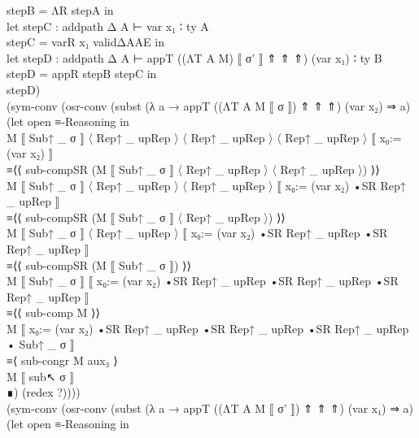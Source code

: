 {\begin{code}
{\>                                  stepB = ΛR stepA in\<\\
\>                              let stepC : addpath Δ A ⊢ var x₁ ∶ ty A\<\\
\>                                  stepC = varR x₁ validΔAAE in\<\\
\>                              let stepD : addpath Δ A ⊢ appT ((ΛT A M) ⟦ σ' ⟧ ⇑ ⇑ ⇑) (var x₁) ∶ ty B\<\\
\>                                  stepD = appR stepB stepC in\<\\
\>                              stepD)\<\\
\>                        (sym-conv (osr-conv (subst (λ a → appT ((ΛT A M ⟦ σ ⟧) ⇑ ⇑ ⇑) (var x₂) ⇒ a) (let open ≡-Reasoning in\<\\
\>                           M ⟦ Sub↑ \_ σ ⟧ 〈 Rep↑ \_ upRep 〉 〈 Rep↑ \_ upRep 〉 〈 Rep↑ \_ upRep 〉 ⟦ x₀:= (var x₂) ⟧\<\\
\>                         ≡⟨⟨ sub-compSR (M ⟦ Sub↑ \_ σ ⟧ 〈 Rep↑ \_ upRep 〉 〈 Rep↑ \_ upRep 〉) ⟩⟩\<\\
\>                           M ⟦ Sub↑ \_ σ ⟧ 〈 Rep↑ \_ upRep 〉 〈 Rep↑ \_ upRep 〉 ⟦ x₀:= (var x₂) •SR Rep↑ \_ upRep ⟧\<\\
\>                         ≡⟨⟨ sub-compSR (M ⟦ Sub↑ \_ σ ⟧ 〈 Rep↑ \_ upRep 〉) ⟩⟩\<\\
\>                           M ⟦ Sub↑ \_ σ ⟧ 〈 Rep↑ \_ upRep 〉 ⟦ x₀:= (var x₂) •SR Rep↑ \_ upRep •SR Rep↑ \_ upRep ⟧\<\\
\>                         ≡⟨⟨ sub-compSR (M ⟦ Sub↑ \_ σ ⟧) ⟩⟩\<\\
\>                           M ⟦ Sub↑ \_ σ ⟧ ⟦ x₀:= (var x₂) •SR Rep↑ \_ upRep •SR Rep↑ \_ upRep •SR Rep↑ \_ upRep ⟧\<\\
\>                         ≡⟨⟨ sub-comp M ⟩⟩\<\\
\>                           M ⟦ x₀:= (var x₂) •SR Rep↑ \_ upRep •SR Rep↑ \_ upRep •SR Rep↑ \_ upRep • Sub↑ \_ σ ⟧\<\\
\>                         ≡⟨ sub-congr M aux₃ ⟩\<\\
\>                           M ⟦ sub↖ σ ⟧\<\\
\>                           ∎) (redex ?)))) \<\\
\>                         (sym-conv (osr-conv (subst (λ a → appT ((ΛT A M ⟦ σ' ⟧) ⇑ ⇑ ⇑) (var x₁) ⇒ a) \<\\
\>                         (let open ≡-Reasoning in\<\\
}
\end{code}}
